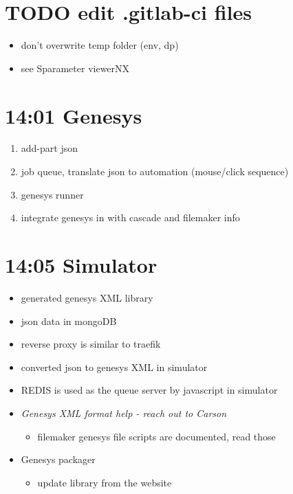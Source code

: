 \documentclass[11pt]{article}
\begin{document}
\section*{{\bfseries\sffamily TODO} edit .gitlab-ci files}
\label{sec:org96c4c58}
\begin{itemize}
\item don't overwrite temp folder (env, dp)
\item see Sparameter viewerNX
\end{itemize}

\section*{14:01 Genesys}
\label{sec:org1e65a3e}
\begin{enumerate}
\item add-part json
\item job queue, translate json to automation (mouse/click sequence)
\item genesys runner

\item integrate genesys in with cascade and filemaker info
\end{enumerate}

\section*{14:05 Simulator}
\label{sec:orgf10b22a}
\begin{itemize}
\item generated genesys XML library
\item json data in mongoDB
\item reverse proxy is similar to traefik
\item converted json to genesys XML in simulator
\item REDIS is used as the queue server by javascript in simulator
\item \emph{Genesys XML format help - reach out to Carson}
\begin{itemize}
\item filemaker genesys file scripts are documented, read those
\end{itemize}
\item Genesys packager
\begin{itemize}
\item update library from the website
\end{itemize}
\end{itemize}
\end{document}
